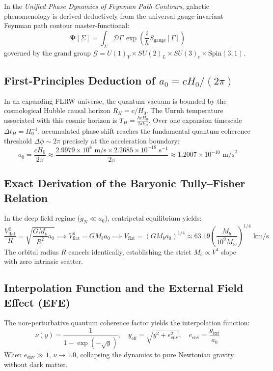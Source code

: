 \documentclass[11pt,a4paper]{article}
\begin{document}
In the \textit{Unified Phase Dynamics of Feynman Path Contours}, galactic phenomenology is derived deductively from the universal gauge-invariant Feynman path contour master-functional:
\begin{equation}
\mathbf{\Psi}[\Sigma] = \int_{\Sigma} \mathcal{D}\Gamma \, \exp\left( \frac{i}{\hbar} S_{\text{gauge}}[\Gamma] \right)
\end{equation}
governed by the grand group $\mathcal{G} = U(1)_Y \times SU(2)_L \times SU(3)_c \times \text{Spin}(3,1)$.

\subsection{First-Principles Deduction of $a_0 = c H_0 / (2\pi)$}
In an expanding FLRW universe, the quantum vacuum is bounded by the cosmological Hubble causal horizon $R_H = c / H_0$. The Unruh temperature associated with this cosmic horizon is $T_H = \frac{\hbar c H_0}{2\pi k_B}$. Over one expansion timescale $\Delta t_H = H_0^{-1}$, accumulated phase shift reaches the fundamental quantum coherence threshold $\Delta \phi \sim 2\pi$ precisely at the acceleration boundary:
\begin{equation}
a_0 = \frac{c H_0}{2\pi} \approx \frac{2.9979 \times 10^8\text{ m/s} \times 2.2685 \times 10^{-18}\text{ s}^{-1}}{2\pi} \approx 1.2007 \times 10^{-10}\text{ m/s}^2
\end{equation}

\subsection{Exact Derivation of the Baryonic Tully--Fisher Relation}
In the deep field regime ($g_N \ll a_0$), centripetal equilibrium yields:
\begin{equation}
\frac{V_{\text{flat}}^2}{R} = \sqrt{\frac{G M_b}{R^2} a_0} \implies V_{\text{flat}}^4 = G M_b a_0 \implies V_{\text{flat}} = (G M_b a_0)^{1/4} \approx 63.19 \left(\frac{M_b}{10^9 M_\odot}\right)^{1/4}\text{ km/s}
\end{equation}
The orbital radius $R$ cancels identically, establishing the strict $M_b \propto V^4$ slope with zero intrinsic scatter.

\subsection{Interpolation Function and the External Field Effect (EFE)}
The non-perturbative quantum coherence factor yields the interpolation function:
\begin{equation}
\nu(y) = \frac{1}{1 - \exp(-\sqrt{y})}, \quad y_{\text{eff}} = \sqrt{y^2 + e_{\text{env}}^2}, \quad e_{\text{env}} = \frac{g_{\text{ext}}}{a_0}
\end{equation}
When $e_{\text{env}} \gg 1$, $\nu \to 1.0$, collapsing the dynamics to pure Newtonian gravity without dark matter.
\end{document}
